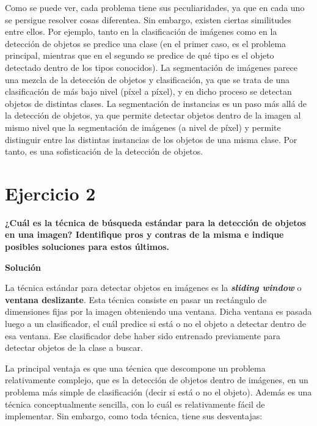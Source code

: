 \documentclass[11pt,a4paper]{article}
\newcommand{\answer}{\noindent\textbf{Solución}}
\newcommand{\question}[1]{\noindent\textbf{#1}}
\newcommand{\nonumsection}[1]{\section*{#1}\addcontentsline{toc}{section}{#1}}
\begin{document}
Como se puede ver, cada problema tiene sus peculiaridades, ya que en cada
uno se persigue resolver cosas diferentea. Sin embargo, existen ciertas
similitudes entre ellos. Por ejemplo, tanto en la clasificación de imágenes como
en la detección de objetos se predice una clase (en el primer caso, es el
problema principal, mientras que en el segundo se predice de qué tipo
es el objeto detectado dentro de los tipos conocidos). La segmentación
de imágenes parece una mezcla de la detección de objetos y clasificación,
ya que se trata de una clasificación de más bajo nivel (píxel a píxel), y en
dicho proceso se detectan objetos de distintas clases. La segmentación
de instancias es un paso más allá de la detección de objetos, ya que permite
detectar objetos dentro de la imagen al mismo nivel que la segmentación de imágenes
(a nivel de píxel) y permite distinguir entre las distintas instancias de
los objetos de una misma clase. Por tanto, es una sofisticación de la
detección de objetos.

\nonumsection{Ejercicio 2}

\question{¿Cuál es la técnica de búsqueda estándar para la detección de
objetos en una imagen? Identifique pros y contras de la misma e
indique posibles soluciones para estos últimos.}

\answer

La técnica estándar para detectar objetos en imágenes es la \textbf{\textit{sliding window}}
o \textbf{ventana deslizante}. Esta técnica consiste en pasar un rectángulo
de dimensiones fijas por la imagen obteniendo una ventana. Dicha ventana es
pasada luego a un clasificador, el cuál predice si está o no el objeto a detectar
dentro de esa ventana. Ese clasificador debe haber sido entrenado previamente
para detectar objetos de la clase a buscar.

La principal ventaja es que una técnica que descompone un problema
relativamente complejo, que es la detección de objetos dentro de imágenes,
en un problema más simple de clasificación (decir si está o no el objeto).
Además es una técnica conceptualmente sencilla, con lo cuál es relativamente
fácil de implementar. Sin embargo, como toda técnica, tiene sus desventajas:
\end{document}
